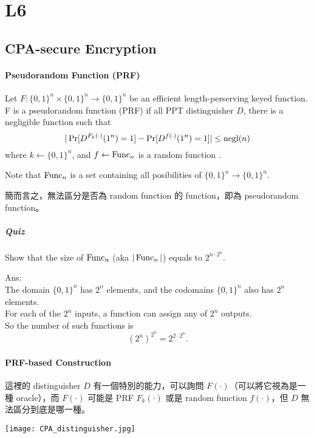 \section{L6}


\subsection{CPA-secure Encryption}


\paragraph{Pseudorandom Function (PRF)}

Let \(F: \{0, 1\}^n \times \{0, 1\}^n \rightarrow \{0, 1\}^n\) be an efficient length-perserving keyed function. \\
F is a pseudorandom function (PRF) if all PPT distinguisher \(D\), there is a negligible function such that
\[
	| \Pr[D^{F_k(\cdot)}(1^n) = 1] - \Pr[D^{f(\cdot)}(1^n) = 1] | \leq \operatorname{negl}(n)
\]
where \(k \leftarrow \{0,1\}^n\), and \(f \leftarrow \operatorname{\mathrm{Func}}_n\) is a random function .

Note that \(\operatorname{\mathrm{Func}}_n\) is a set containing all posibilities of \(\{0, 1\}^n \rightarrow \{0, 1\}^n\).

簡而言之，無法區分是否為 random function 的 function，即為 pseudorandom function。

\subparagraph{Quiz}

Show that the size of \(\operatorname{\mathrm{Func}}_n\) (aka \(|\operatorname{\mathrm{Func}}_n|\)) equals to \(2^{n \cdot 2^n}\).

Ans: \\
The domain \(\{0, 1\}^n\) has \(2^n\) elements, and the codomains \(\{0, 1\}^n\) also has \(2^n\) elements. \\
For each of the \(2^n\) inputs, a function can assign any of \(2^n\) outputs. \\
So the number of such functions is
\[(2^n)^{2^n} = 2^{2 \cdot 2^n}.\]


\paragraph{PRF-based Construction}

這裡的 distinguisher \(D\) 有一個特別的能力，可以詢問 \(F(\cdot)\)（可以將它視為是一種 oracle），而 \(F(\cdot)\) 可能是 PRF \(F_k(\cdot)\) 或是 random function \(f(\cdot)\)，但 \(D\) 無法區分到底是哪一種。

\begin{center}
	\texttt{[image: CPA\_distinguisher.jpg]}
\end{center}

